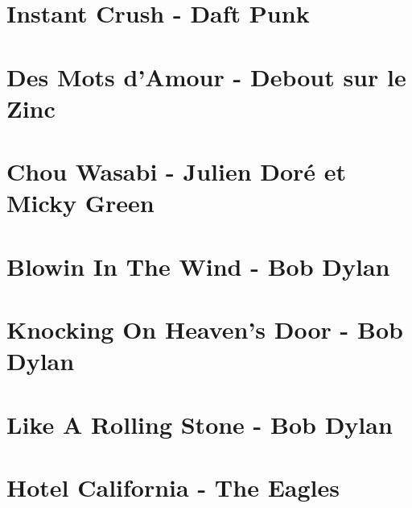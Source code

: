 \documentclass[11pt]{article}
\begin{document}
\section{Instant Crush - Daft Punk}
\begin{guitar}

\end{guitar}

\section{Des Mots d'Amour - Debout sur le Zinc}


\section{Chou Wasabi - Julien Doré et Micky Green}
\begin{guitar}

\end{guitar}


\section{Blowin In The Wind - Bob Dylan}
\begin{guitar}

\end{guitar}



\section{Knocking On Heaven's Door - Bob Dylan}
\begin{guitar}

\end{guitar}

\section*{Like A Rolling Stone - Bob Dylan}
\begin{guitar}

\end{guitar}



\section{Hotel California - The Eagles}
\begin{guitar}

\end{guitar}
\end{document}
